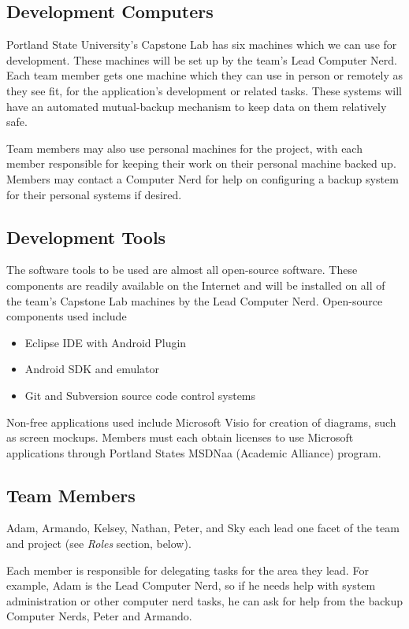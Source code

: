 \documentclass[11pt]{article}
\begin{document}
	\subsection{Development Computers}
		Portland State University's Capstone Lab has six machines which we can use for development. These machines will be set up by the team's Lead Computer Nerd. Each team member gets one machine which they can use in person or remotely as they see fit, for the application's development or related tasks. These systems will have an automated mutual-backup mechanism to keep data on them relatively safe.

	Team members may also use personal machines for the project, with each member responsible for keeping their work on their personal machine backed up. Members may contact a Computer Nerd for help on configuring a backup system for their personal systems if desired.

	\subsection{Development Tools}
		The software tools to be used are almost all open-source software. These components are readily available on the Internet and will be installed on all of the team's Capstone Lab machines by the Lead Computer Nerd. Open-source components used include
		\begin{itemize}
			\item{Eclipse IDE with Android Plugin}
			\item{Android SDK and emulator}
			\item{Git and Subversion source code control systems}
		\end{itemize}
		Non-free applications used include Microsoft Visio for creation of diagrams, such as screen mockups. Members must each obtain licenses to use Microsoft applications through Portland States MSDNaa (Academic Alliance) program.

	\subsection{Team Members}
		Adam, Armando, Kelsey, Nathan, Peter, and Sky each lead one facet of the team and project (see {\em Roles} section, below).

		Each member is responsible for delegating tasks for the area they lead. For example, Adam is the Lead Computer Nerd, so if he needs help with system administration or other computer nerd tasks, he can ask for help from the backup Computer Nerds, Peter and Armando.
\end{document}
